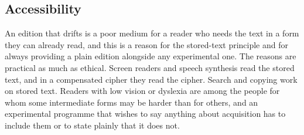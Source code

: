 \subsection{Accessibility}

An edition that drifts is a poor medium for a reader who needs the text in a form they can already read, and this is a reason for the stored-text principle and for always providing a plain edition alongside any experimental one. The reasons are practical as much as ethical. Screen readers and speech synthesis read the stored text, and in a compensated cipher they read the cipher. Search and copying work on stored text. Readers with low vision or dyslexia are among the people for whom some intermediate forms may be harder than for others, and an experimental programme that wishes to say anything about acquisition has to include them or to state plainly that it does not.
